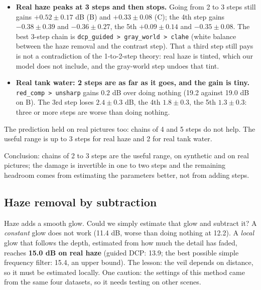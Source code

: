 \documentclass[10pt,a4paper]{article}
\newcommand{\tablein}[1]{}
\newcommand{\SYN}{\textcolor{orange!85!black}{\textbf{[SYNTHETIC]}}}
\newcommand{\REAL}{\textcolor{teal!80!black}{\textbf{[REAL]}}}
\begin{document}
\begin{itemize}
\item \textbf{Real haze peaks at 3 steps and then stops.} Going from 2 to 3 steps still gains $+0.52\pm0.17$ dB (B) and $+0.33\pm0.08$ (C); the 4th step gains $-0.38\pm0.39$ and $-0.36\pm0.27$, the 5th $+0.09\pm0.14$ and $-0.35\pm0.08$. The best 3-step chain is \texttt{dcp\_guided > gray\_world > clahe} (white balance between the haze removal and the contrast step). That a third step still pays is not a contradiction of the 1-to-2-step theory: real haze is tinted, which our model does not include, and the gray-world step undoes that tint.
\item \textbf{Real tank water: 2 steps are as far as it goes, and the gain is tiny.} \texttt{red\_comp > unsharp} gains $0.2$ dB over doing nothing (19.2 against 19.0 dB on B). The 3rd step loses $2.4\pm0.3$ dB, the 4th $1.8\pm0.3$, the 5th $1.3\pm0.3$: three or more steps are worse than doing nothing.
\end{itemize}
The prediction held on real pictures too: chains of 4 and 5 steps do not help. The useful range is up to 3 steps for real haze and 2 for real tank water.

Conclusion: chains of 2 to 3 steps are the useful range, on synthetic and on real pictures; the damage is invertible in one to two steps and the remaining headroom comes from estimating the parameters better, not from adding steps.

\subsection{Haze removal by subtraction}
Haze adds a smooth glow. Could we simply estimate that glow and subtract it? A \emph{constant} glow does not work (11.4 dB, worse than doing nothing at 12.2). A \emph{local} glow that follows the depth, estimated from how much the detail has faded, reaches \textbf{15.0 dB on real haze} (guided DCP: 13.9; the best possible simple frequency filter: 15.4, an upper bound). The lesson: the veil depends on distance, so it must be estimated locally. One caution: the settings of this method came from the same four datasets, so it needs testing on other scenes.
\begin{table}[H]\centering\scriptsize\tablein{frequency_subtraction}\caption{Haze removal by subtraction on the held-out real pairs (``real'', \REAL) and on their synthetic twins (``twin'', \SYN).}\end{table}
\end{document}
